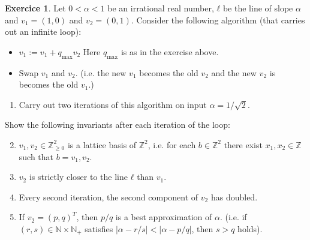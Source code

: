 \documentclass[12pt,a4paper]{article}
\theoremstyle{plain}
\newtheorem*{Sol*}{Solution}
\theoremstyle{definition}
\newtheorem{Ex}{Exercice}
\newif\ifsolutions
\newcommand{\exercise}[2]{
			\begin{Ex} #1 \end{Ex}
			\ifsolutions  \begin{Sol*} #2 \end{Sol*} \bigskip \else \bigskip  \fi
		}
\begin{document}
  \exercise{
    Let $0< α <1 $ be an irrational real number, $ℓ$ be the line of slope $α$ and $v_1 = (1,0)$ and $v_2 = (0,1)$.
    Consider the following algorithm (that carries out an infinite loop): 
    \begin{itemize}    
    \item $v_1 := v_1 + q_{\max} v_2$ \hfill {\scriptsize Here $q_{\max}$ is as in the exercise above.}
    \item Swap $v_1$ and $v_2$.
      \hfill 
      {\scriptsize (i.e. the new $v_1$ becomes the old $v_2$ and the new $v_2$ is becomes the old $v_1$.)} 
    \end{itemize}
    
    
    \begin{enumerate}
    \item Carry out two iterations of this algorithm on input
      $α=1/\sqrt{2}$.
    \end{enumerate}

    Show the following invariants after each iteration of the loop:
    \begin{enumerate}
      \setcounter{enumi}{1}
    \item $v_1,v_2 ∈ ℤ_{≥0}^2$ is a lattice basis of $ℤ^2$, i.e. for each $b ∈ℤ^2$ there exist $x_1,x_2 ∈ℤ$ such that $b = v_1,v_2$.
    \item $v_2$ is strictly closer to the line $ℓ$ than $v_1$. 
    \item Every second iteration, the second component of $v_2$ has doubled.
    \item If $v_2 = (p , q)^T$, then ${p}/{q}$ is a best approximation of $α$. (i.e. if $(r,s) ∈ ℕ × ℕ_+$ satisfies $| α - r/s| < | α - p/q|$, then $s>q$ holds).   
    \end{enumerate}
    
  }{}
\end{document}
